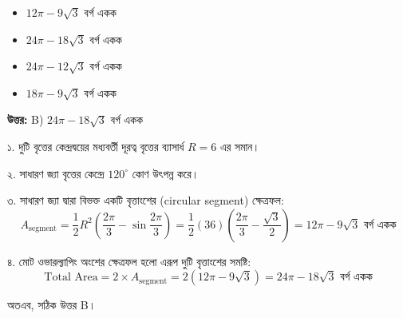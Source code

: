 \documentclass[12pt, a4paper]{article}
\begin{document}
\begin{itemize}[label={}, leftmargin=1cm, itemsep=0.5em]
    \item[\textbf{A)}] $12\pi - 9\sqrt{3}$ বর্গ একক
    \item[\textbf{B)}] $24\pi - 18\sqrt{3}$ বর্গ একক
    \item[\textbf{C)}] $24\pi - 12\sqrt{3}$ বর্গ একক
    \item[\textbf{D)}] $18\pi - 9\sqrt{3}$ বর্গ একক
\end{itemize}

\vspace{0.5em}
\begin{tcolorbox}[answerbox]
    \textbf{\color{success} উত্তর:} B) $24\pi - 18\sqrt{3}$ বর্গ একক
\end{tcolorbox}
\vspace{1em}

\begin{tcolorbox}[solutionbox={সমাধান (Solution)}]
    \noindent
    ১. দুটি বৃত্তের কেন্দ্রদ্বয়ের মধ্যবর্তী দূরত্ব বৃত্তের ব্যাসার্ধ $R = 6$ এর সমান।
    
    \vspace{0.5em}
    ২. সাধারণ জ্যা বৃত্তের কেন্দ্রে $120^{\circ}$ কোণ উৎপন্ন করে।
    
    \vspace{0.5em}
    ৩. সাধারণ জ্যা দ্বারা বিভক্ত একটি বৃত্তাংশের (circular segment) ক্ষেত্রফল:
    \[ A_{\text{segment}} = \frac{1}{2} R^2 \left( \frac{2\pi}{3} - \sin\frac{2\pi}{3} \right) = \frac{1}{2} (36) \left( \frac{2\pi}{3} - \frac{\sqrt{3}}{2} \right) = 12\pi - 9\sqrt{3} \text{ বর্গ একক} \]
    
    \vspace{0.5em}
    ৪. মোট ওভারল্যাপিং অংশের ক্ষেত্রফল হলো এরূপ দুটি বৃত্তাংশের সমষ্টি:
    \[ \text{Total Area} = 2 \times A_{\text{segment}} = 2(12\pi - 9\sqrt{3}) = 24\pi - 18\sqrt{3} \text{ বর্গ একক} \]
    
    \vspace{0.5em}
    অতএব, সঠিক উত্তর B।
\end{tcolorbox}

\vspace{2em}
\end{document}
